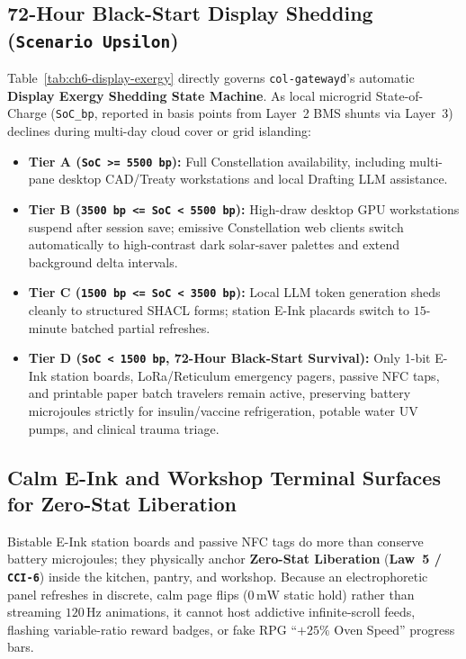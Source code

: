 \subsection{72-Hour Black-Start Display Shedding (\texttt{Scenario Upsilon})}

Table~\ref{tab:ch6-display-exergy} directly governs \texttt{col-gatewayd}'s automatic \textbf{Display Exergy Shedding State Machine}. As local microgrid State-of-Charge (\texttt{SoC\_bp}, reported in basis points from Layer~2 BMS shunts via Layer~3) declines during multi-day cloud cover or grid islanding:
\begin{itemize}
    \item \textbf{Tier A (\texttt{SoC >= 5500 bp}):} Full Constellation availability, including multi-pane desktop CAD/Treaty workstations and local Drafting LLM assistance.
    \item \textbf{Tier B (\texttt{3500 bp <= SoC < 5500 bp}):} High-draw desktop GPU workstations suspend after session save; emissive Constellation web clients switch automatically to high-contrast dark solar-saver palettes and extend background delta intervals.
    \item \textbf{Tier C (\texttt{1500 bp <= SoC < 3500 bp}):} Local LLM token generation sheds cleanly to structured SHACL forms; station E-Ink placards switch to $15$-minute batched partial refreshes.
    \item \textbf{Tier D (\texttt{SoC < 1500 bp}, 72-Hour Black-Start Survival):} Only 1-bit E-Ink station boards, LoRa/Reticulum emergency pagers, passive NFC taps, and printable paper batch travelers remain active, preserving battery microjoules strictly for insulin/vaccine refrigeration, potable water UV pumps, and clinical trauma triage.
\end{itemize}

\subsection{Calm E-Ink and Workshop Terminal Surfaces for Zero-Stat Liberation}
\label{subsec:eink-zero-stat-liberation}

Bistable E-Ink station boards and passive NFC tags do more than conserve battery microjoules; they physically anchor \textbf{Zero-Stat Liberation} (\textbf{Law~5 / \texttt{CCI-6}}) inside the kitchen, pantry, and workshop. Because an electrophoretic panel refreshes in discrete, calm page flips ($0\,\mathrm{mW}$ static hold) rather than streaming $120\,\mathrm{Hz}$ animations, it cannot host addictive infinite-scroll feeds, flashing variable-ratio reward badges, or fake RPG ``$+25\%$ Oven Speed'' progress bars.

